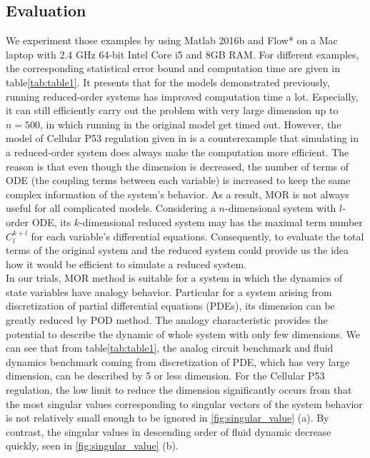 \documentclass[runningheads,a4paper]{llncs}
\theoremstyle{definition}
\theoremstyle{plain}
\begin{document}
\subsection{Evaluation} 
We experiment those examples by using Matlab 2016b and Flow* on a Mac laptop with 2.4 GHz 64-bit Intel Core i5 and 8GB RAM. For different examples, the corresponding statistical error bound and computation time are given in table\ref{tab:table1}.
It presents that for the models demonstrated previously, running reduced-order systems has improved computation time a lot. Especially, it can still efficiently carry out the problem with very large dimension up to $n=500$, in which running in the original model get timed out.  However, the model of Cellular P53 regulation given in \cite{p53} is a counterexample that simulating in a reduced-order system does always make the computation more efficient. The reason is that even though the dimension is decreased, the number of terms of ODE (the coupling terms between each variable) is increased to keep the same complex information of the system's behavior. As a result, MOR is not always useful for all complicated models. Considering a $n$-dimensional system with $l$-order ODE, its $k$-dimensional reduced system may has the maximal term number $C^{k+l}_l$ for each variable's differential equations. Consequently, to evaluate the total terms of the original system and the reduced system could provide us the idea how it would be efficient to simulate a reduced system. \\
In our trials, MOR method is suitable for a system in which the dynamics of state variables have analogy behavior. Particular for a system arising from discretization of partial differential equations (PDEs), its dimension can be greatly reduced by POD method. The analogy characteristic provides the potential to describe the dynamic of whole system with only few dimensions. We can see that from table\ref{tab:table1}, the analog circuit benchmark and fluid dynamics benchmark coming from discretization of PDE, which has very large dimension, can be described by 5 or less dimension. For the Cellular P53 regulation, the low limit to reduce the dimension significantly occurs from that the most singular values corresponding to singular vectors of the system behavior is not relatively small enough to be ignored in \ref{fig:singular_value} (a). By contrast, the singular values in descending order of fluid dynamic decrease quickly, seen in \ref{fig:singular_value} (b).
 
\end{document}
